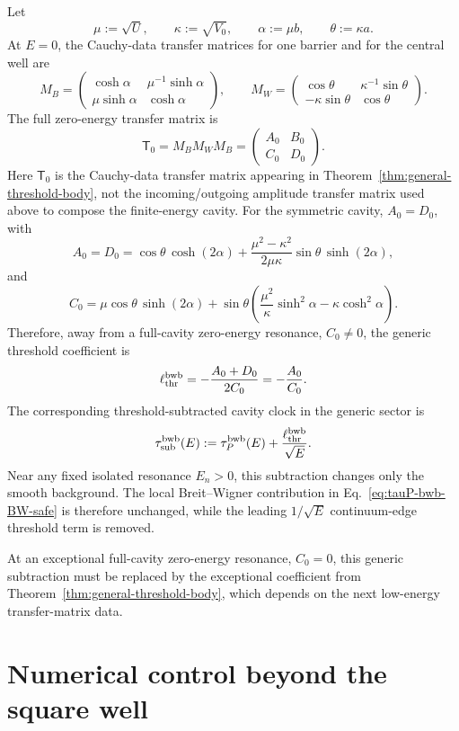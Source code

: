 \documentclass[aps,pra,preprint,notitlepage,nofootinbib]{revtex4-2}
\begin{document}
Let
\[
\mu:=\sqrt U,\qquad
\kappa:=\sqrt{V_0},\qquad
\alpha:=\mu b,\qquad
\theta:=\kappa a.
\]
At \(E=0\), the Cauchy-data transfer matrices for one barrier and for the
central well are
\[
M_B=
\begin{pmatrix}
\cosh\alpha & \mu^{-1}\sinh\alpha\\
\mu\sinh\alpha & \cosh\alpha
\end{pmatrix},
\qquad
M_W=
\begin{pmatrix}
\cos\theta & \kappa^{-1}\sin\theta\\
-\kappa\sin\theta & \cos\theta
\end{pmatrix}.
\]
The full zero-energy transfer matrix is
\[
\mathsf T_0=M_BM_WM_B
=
\begin{pmatrix}
A_0&B_0\\
C_0&D_0
\end{pmatrix}.
\]
Here \(\mathsf T_0\) is the Cauchy-data transfer matrix appearing in
Theorem~\ref{thm:general-threshold-body}, not the incoming/outgoing
amplitude transfer matrix used above to compose the finite-energy cavity.
For the symmetric cavity, \(A_0=D_0\), with
\[
A_0=D_0
=
\cos\theta\,\cosh(2\alpha)
+
\frac{\mu^2-\kappa^2}{2\mu\kappa}
\sin\theta\,\sinh(2\alpha),
\]
and
\[
C_0
=
\mu\cos\theta\,\sinh(2\alpha)
+
\sin\theta
\left(
\frac{\mu^2}{\kappa}\sinh^2\alpha
-\kappa\cosh^2\alpha
\right).
\]
Therefore, away from a full-cavity zero-energy resonance, \(C_0\neq0\), the
generic threshold coefficient is
\[
\ell_{\rm thr}^{\rm bwb}
=
-\frac{A_0+D_0}{2C_0}
=
-\frac{A_0}{C_0}.
\]
The corresponding threshold-subtracted cavity clock in the generic sector is
\[
\tau_{\rm sub}^{\rm bwb}(E)
:=
\tau_P^{\rm bwb}(E)
+
\frac{\ell_{\rm thr}^{\rm bwb}}{\sqrt E}.
\]
Near any fixed isolated resonance \(E_n>0\), this subtraction changes only the
smooth background. The local Breit--Wigner contribution in
Eq.~\eqref{eq:tauP-bwb-BW-safe} is therefore unchanged, while the leading
\(1/\sqrt{E}\) continuum-edge threshold term is removed.

At an exceptional full-cavity zero-energy resonance, \(C_0=0\), this generic
subtraction must be replaced by the exceptional coefficient from
Theorem~\ref{thm:general-threshold-body}, which depends on the next
low-energy transfer-matrix data.

\section{Numerical control beyond the square well}
\label{sec:numerics}
\end{document}
